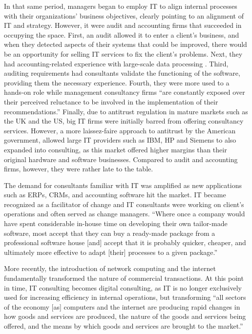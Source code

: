 \documentclass[12pt]{article}
\begin{document}
In that same period, managers began to employ IT to align internal
processes with their organizations' business objectives, clearly
pointing to an alignment of IT and strategy. However, it were audit and
accounting firms that succeeded in occupying the space. First, an audit
allowed it to enter a client's business, and when they detected aspects
of their systems that could be improved, there would be an opportunity
for selling IT services to fix the client's problems. \citep[
73]{mazzucato2023} Next, they had accounting-related experience with
large-scale data processing \citep[ 121]{armbruster2006}. Third,
auditing requirements had consultants validate the functioning of the
software, providing them the necessary experience. Fourth, they were
more used to a hands-on role while management consultancy firms ``are
constantly exposed over their perceived reluctance to be involved in the
implementation of their recommendations.'' \citep[ 168]{czerniawska1999}
Finally, due to antitrust regulation in mature markets such as the UK
and the US, big IT firms were initially barred from offering consultancy
services. However, a more laissez-faire approach to antitrust by the
American government, allowed large IT providers such as IBM, HP and
Siemens to also expanded into consulting, as this market offered higher
margins than their original hardware and software businesses. Compared
to audit and accounting firms, however, they were rather late to the
table.

The demand for consultants familiar with IT was amplified as new
applications such as ERPs, CRMs, and accounting software hit the market.
IT became recognized as a facilitator of change and IT consultants were
working on client's operations and often served as change managers.
``Where once a company would have spent considerable in-house time on
developing their own tailor-made software, most accept that they can buy
a ready-made package from a professional software house {[}and{]} accept
that it is probably quicker, cheaper, and ultimately more effective to
adapt {[}their{]} processes to a given package.'' \citep[
23]{czerniawska1999}

More recently, the introduction of network computing and the internet
fundamentally transformed the nature of commercial transactions. At this
point in time, IT consulting becomes digital consulting, as IT is no
longer exclusively used for increasing efficiency in internal
operations, but transforming ``all sectors of the economy {[}as{]}
computers and the internet are producing rapid changes in how goods and
services are produced, the nature of the goods and services being
offered, and the means by which goods and services are brought to the
market.'' \citep[ 2-14]{brynjolfsson2000}
\end{document}

